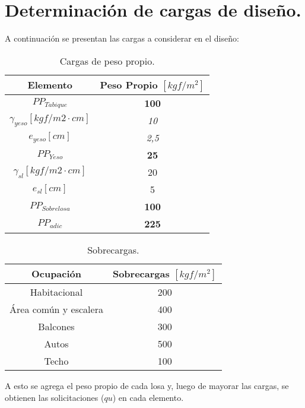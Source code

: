 \section{Determinación de cargas de diseño.}

    A continuación se presentan las cargas a considerar en el diseño:
    
    \begin{table}[htbp]
      \centering
      \caption{Cargas de peso propio.}
        \begin{tabular}{cc}
        \hline
        \textbf{Elemento} & \boldmath{}\textbf{Peso Propio $[kgf/m^2]$}\unboldmath{} \bigstrut\\
        \hline
        \boldmath{}\textbf{$PP_{Tabique}$}\unboldmath{} & \textbf{100} \bigstrut[t]\\
        \textit{$\gamma_{yeso} [kgf/m2 \cdot cm]$} & \textit{10} \\
        \textit{$e_{yeso} [cm]$} & \textit{2,5} \\
        \boldmath{}\textbf{$PP_{Yeso}$}\unboldmath{} & \textbf{25} \\
        $\gamma_{sl} [kgf/m2 \cdot cm]$ & 20 \\
        $e_{sl} [cm]$ & 5 \\
        \boldmath{}\textbf{$PP_{Sobrelosa}$}\unboldmath{} & \textbf{100} \bigstrut[b]\\
        \hline
        \boldmath{}\textbf{$PP_{adic}$}\unboldmath{} & \textbf{225} \bigstrut\\
        \hline
        \end{tabular}%
      \label{peso_propio}%
    \end{table}%

    \begin{table}[htbp]
      \centering
      \caption{Sobrecargas.}
        \begin{tabular}{cc}
        \hline
        Ocupación & Sobrecargas $[kgf/m^2]$ \bigstrut\\
        \hline
        Habitacional & 200 \bigstrut[t]\\
        Área común y escalera & 400 \\
        Balcones & 300 \\
        Autos & 500 \\
        Techo & 100 \bigstrut[b]\\
        \hline
        \end{tabular}%
      \label{sobrecarga}%
    \end{table}%
    
    A esto se agrega el peso propio de cada losa y, luego de mayorar las cargas, se obtienen las solicitaciones ($qu$) en cada elemento.